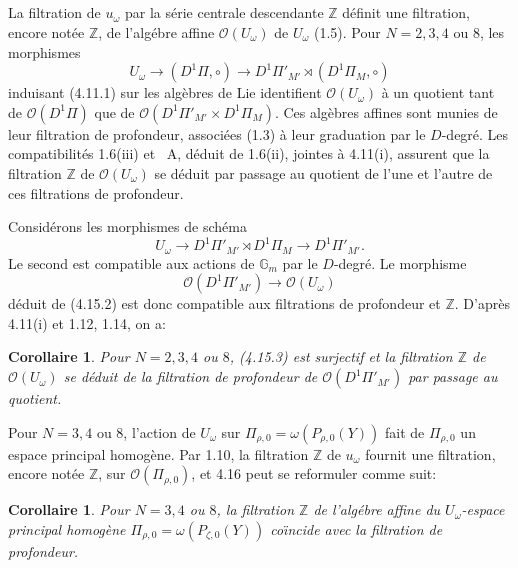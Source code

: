 \documentclass[11pt,a4paper]{article}
\theoremstyle{plain}
\newtheorem{corollary}[theorem]{Corollaire}
\theoremstyle{definition}
\newcommand{\Gm}{\mathbb{G}_m}
\newcommand{\Z}{\mathbb{Z}}
\begin{document}
\subsection{}
La filtration de $u_\omega$ par la s\'erie centrale descendante $\Z$ d\'efinit une filtration, encore not\'ee $\Z$, de l'alg\'ebre affine $\mathcal{O}(U_\omega)$ de $U_\omega$ (1.5). Pour $N=2,3,4$ ou $8$, les morphismes
\begin{equation}\label{eq:4.15.1}
U_\omega \to (D^1\Pi, \circ) \to D^1\Pi'_{M'} \rtimes (D^1\Pi_M, \circ)
\end{equation}
induisant (4.11.1) sur les alg\`ebres de Lie identifient $\mathcal{O}(U_\omega)$ \`a un quotient tant de $\mathcal{O}(D^1\Pi)$ que de $\mathcal{O}(D^1\Pi'_{M'} \times D^1\Pi_M)$. Ces alg\`ebres affines sont munies de leur filtration de profondeur, associ\'ees (1.3) \`a leur graduation par le $D$-degr\'e. Les compatibilit\'es 1.6(iii) et \cite{1}~A, d\'eduit de 1.6(ii), jointes \`a 4.11(i), assurent que la filtration $\Z$ de $\mathcal{O}(U_\omega)$ se d\'eduit par passage au quotient de l'une et l'autre de ces filtrations de profondeur.

Consid\'erons les morphismes de sch\'ema
\begin{equation}\label{eq:4.15.2}
U_\omega \to D^1\Pi'_{M'} \rtimes D^1\Pi_M \to D^1\Pi'_{M'}.
\end{equation}
Le second est compatible aux actions de $\Gm$ par le $D$-degr\'e. Le morphisme
\begin{equation}\label{eq:4.15.3}
\mathcal{O}(D^1\Pi'_{M'}) \to \mathcal{O}(U_\omega)
\end{equation}
d\'eduit de (4.15.2) est donc compatible aux filtrations de profondeur et $\Z$. D'apr\`es 4.11(i) et 1.12, 1.14, on a:

\begin{corollary}\label{cor:4.16}
Pour $N=2,3,4$ ou $8$, (4.15.3) est surjectif et la filtration $\Z$ de $\mathcal{O}(U_\omega)$ se d\'eduit de la filtration de profondeur de $\mathcal{O}(D^1\Pi'_{M'})$ par passage au quotient.
\end{corollary}

Pour $N=3,4$ ou $8$, l'action de $U_\omega$ sur $\Pi_{\rho,0} = \omega(P_{\rho,0}(Y))$ fait de $\Pi_{\rho,0}$ un espace principal homog\`ene. Par 1.10, la filtration $\Z$ de $u_\omega$ fournit une filtration, encore not\'ee $\Z$, sur $\mathcal{O}(\Pi_{\rho,0})$, et 4.16 peut se reformuler comme suit:

\begin{corollary}\label{cor:4.17}
Pour $N=3,4$ ou $8$, la filtration $\Z$ de l'alg\'ebre affine du $U_\omega$-espace principal homog\`ene $\Pi_{\rho,0} = \omega(P_{\zeta,0}(Y))$ co\"{\i}ncide avec la filtration de profondeur.
\end{corollary}
\end{document}
